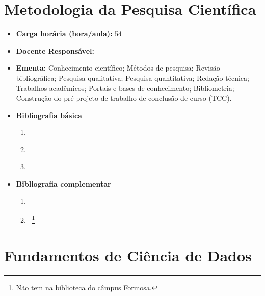 \documentclass[11pt,fleqn]{book} %
\begin{document}

\newpage
\section{Metodologia da Pesquisa Científica}\label{disc:metodologia}

\begin{itemize}
	\item \textbf{Carga horária (hora/aula):} 54
	\item \textbf{Docente Responsável:}~
	\item \textbf{Ementa:} 
	Conhecimento científico;
	Métodos de pesquisa; 
	Revisão bibliográfica;
	Pesquisa qualitativa;
	Pesquisa quantitativa; 
	Redação técnica;
	Trabalhos acadêmicos;
	Portais e bases de conhecimento;
	Bibliometria;
	Construção do pré-projeto de trabalho de conclusão de curso (TCC).
	\item \textbf{Bibliografia básica}
	\begin{enumerate}
		\item \cite{Andrade2005introduccao}
		\item \cite{gil2002elaborar}
		\item \cite{wazlawick2017metodologia}
	\end{enumerate}
	\item \textbf{Bibliografia complementar}
	\begin{enumerate}
		\item \cite{koche2016fundamentos}
		\item \cite{aquino2017escrever}~\footnote{Não tem na biblioteca do câmpus Formosa.}
	\end{enumerate} 	
\end{itemize}


\newpage
\section{Fundamentos de Ciência de Dados}\label{disc:datascience}
\end{document}
